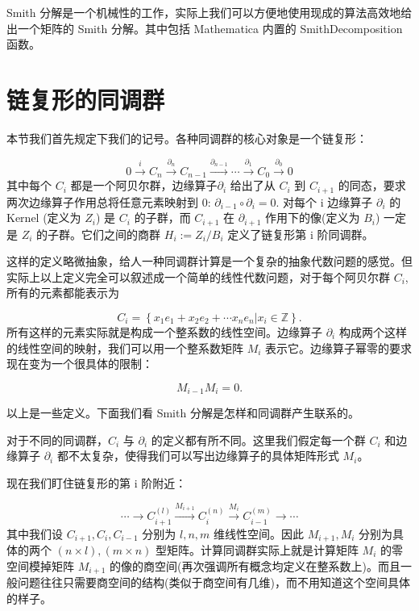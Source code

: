 \documentclass[UTF8]{ctexart}
\begin{document}
Smith 分解是一个机械性的工作，实际上我们可以方便地使用现成的算法高效地给出一个矩阵的 Smith 分解。其中包括 Mathematica
内置的 SmithDecomposition 函数。

\section*{链复形的同调群}
\noindent
本节我们首先规定下我们的记号。各种同调群的核心对象是一个链复形：

\begin{equation}
0\stackrel{i}{\longrightarrow}C_{n}\stackrel{\partial_{n}}{\longrightarrow}C_{n-1}\stackrel{\partial_{n-1}}{\longrightarrow}\cdots\stackrel{\partial_{1}}{\longrightarrow}C_{0}\stackrel{\partial_{0}}{\longrightarrow}0
\end{equation}
其中每个 $C_{i}$ 都是一个阿贝尔群，边缘算子$\partial_{i}$ 给出了从 $C_{i}$ 到 $C_{i+1}$
的同态，要求两次边缘算子作用总将任意元素映射到 0: $\partial_{i-1}\circ\partial_{i}=0$. 对每个
i 边缘算子 $\partial_{i}$ 的 Kernel (定义为 $Z_{i}$) 是 $C_{i}$ 的子群，而 $C_{i+1}$
在 $\partial_{i+1}$ 作用下的像(定义为 $B_{i}$) 一定是 $Z_{i}$ 的子群。它们之间的商群 $H_{i}:=Z_{i}/B_{i}$
定义了链复形第 i 阶同调群。

这样的定义略微抽象，给人一种同调群计算是一个复杂的抽象代数问题的感觉。但实际上以上定义完全可以叙述成一个简单的线性代数问题，对于每个阿贝尔群
$C_{i}$, 所有的元素都能表示为

\begin{equation}
C_{i}=\left\{ \left.x_{1}e_{1}+x_{2}e_{2}+\cdots x_{n}e_{n}\right|x_{i}\in\mathbb{Z}\right\} .
\end{equation}
所有这样的元素实际就是构成一个整系数的线性空间。边缘算子 $\partial_{i}$ 构成两个这样的线性空间的映射，我们可以用一个整系数矩阵
$M_{i}$ 表示它。边缘算子幂零的要求现在变为一个很具体的限制：

\begin{equation}
M_{i-1}M_{i}=0.
\end{equation}

以上是一些定义。下面我们看 Smith 分解是怎样和同调群产生联系的。

对于不同的同调群，$C_{i}$ 与 $\partial_{i}$ 的定义都有所不同。这里我们假定每一个群 $C_{i}$ 和边缘算子
$\partial_{i}$ 都不太复杂，使得我们可以写出边缘算子的具体矩阵形式 $M_{i}$。

现在我们盯住链复形的第 i 阶附近：

\begin{equation}
\cdots\stackrel{}{\longrightarrow}C_{i+1}^{(l)}\stackrel{M_{i+1}}{\longrightarrow}C_{i}^{(n)}\stackrel{M_{i}}{\longrightarrow}C_{i-1}^{(m)}\stackrel{}{\longrightarrow}\cdots
\end{equation}
其中我们设 $C_{i+1},C_{i},C_{i-1}$ 分别为 $l,n,m$ 维线性空间。因此 $M_{i+1},M_{i}$
分别为具体的两个 $\left(n\times l\right),\left(m\times n\right)$ 型矩阵。计算同调群实际上就是计算矩阵
$M_{i}$ 的零空间模掉矩阵 $M_{i+1}$ 的像的商空间(再次强调所有概念均定义在整系数上)。而且一般问题往往只需要商空间的结构(类似于商空间有几维)，而不用知道这个空间具体的样子。
\end{document}

